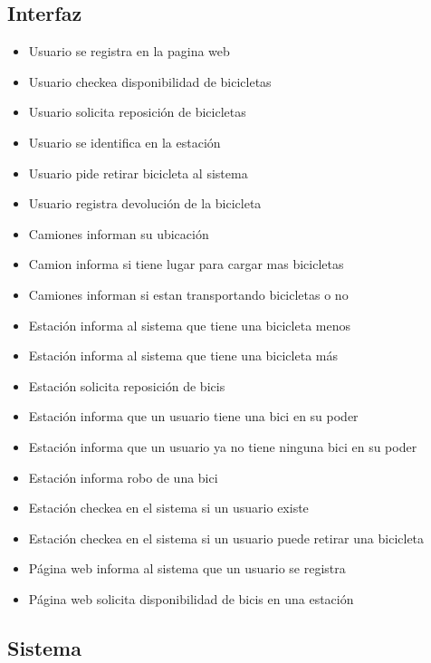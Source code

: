 \documentclass[a4paper, 10pt, twoside]{article}
\begin{document}
\subsection{Interfaz}

\begin{multicols}{2}
  \begin{itemize}
    \item Usuario se registra en la pagina web
    \item Usuario checkea disponibilidad de bicicletas
    \item Usuario solicita reposición de bicicletas
    \item Usuario se identifica en la estación	
    \item Usuario pide retirar bicicleta al sistema
    \item Usuario registra devolución de la bicicleta
    \item Camiones informan su ubicación 
    \item Camion informa si tiene lugar para cargar mas bicicletas
    \item Camiones informan si estan transportando bicicletas o no
    \item Estación informa al sistema que tiene una bicicleta menos 
    \item Estación informa al sistema que tiene una bicicleta más
    \item Estación solicita reposición de bicis   
    \item Estación informa que un usuario tiene una bici en su poder
    \item Estación informa que un usuario ya no tiene ninguna bici en su poder
    \item Estación informa robo de una bici
    \item Estación checkea en el sistema si un usuario existe
    \item Estación checkea en el sistema si un usuario puede retirar una bicicleta
    \item Página web informa al sistema que un usuario se registra
    \item Página web solicita disponibilidad de bicis en una estación
  \end{itemize}
\end{multicols}


\subsection{Sistema}
\end{document}
